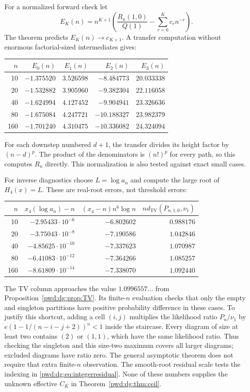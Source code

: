 \documentclass[11pt,letterpaper]{article}
\numberwithin{equation}{section}
\theoremstyle{remark}\newtheorem{remark}[theorem]{Remark}
\newcommand{\TV}{d_{\mathrm{TV}}}
\begin{document}
For a normalized forward check let
\[
 E_K(n)=n^{K+1}\left(\frac{R_n(1,0)}{Q(1)}-\sum_{r=0}^Kc_rn^{-r}\right).
\]
The theorem predicts $E_K(n)\to c_{K+1}$. A transfer computation without enormous factorial-sized intermediates gives:
\begin{center}
\begin{tabular}{@{}rrrrr@{}}\toprule
$n$ & $E_0(n)$ & $E_1(n)$ & $E_2(n)$ & $E_3(n)$\\\midrule
10 & $-1.375520$ & $3.526598$ & $-8.484773$ & $20.033338$\\
20 & $-1.532882$ & $3.905960$ & $-9.382304$ & $22.116058$\\
40 & $-1.624994$ & $4.127452$ & $-9.904941$ & $23.326636$\\
80 & $-1.675084$ & $4.247721$ & $-10.188327$ & $23.982379$\\
160 & $-1.701240$ & $4.310475$ & $-10.336082$ & $24.324094$\\\bottomrule
\end{tabular}
\end{center}
For each downstep numbered $d+1$, the transfer divides its height factor by $(n-d)^{p}$. The product of the denominators is $(n!)^p$ for every path, so this computes $R_n$ directly. This normalization is also tested against exact small cases.

For inverse diagnostics choose $L=\log a_n$ and compute the large root of $H_4(x)=L$. These are real-root errors, not threshold errors:
\begin{center}
\begin{tabular}{@{}rrrr@{}}\toprule
$n$ & $x_4(\log a_n)-n$ & $(x_4-n)n^6\log n$ & $n\TV(P_{n,1,0},\nu_1)$\\\midrule
10 & $-2.95433\cdot10^{-6}$ & $-6.802602$ & $0.988176$\\
20 & $-3.75043\cdot10^{-8}$ & $-7.190586$ & $1.042846$\\
40 & $-4.85625\cdot10^{-10}$ & $-7.337623$ & $1.070987$\\
80 & $-6.41083\cdot10^{-12}$ & $-7.364266$ & $1.085257$\\
160 & $-8.61809\cdot10^{-14}$ & $-7.338070$ & $1.092440$\\\bottomrule
\end{tabular}
\end{center}
The TV column approaches the value $1.0996557\ldots$ from Proposition~\ref{pwd:dg:prop:TV}. Its finite-$n$ evaluation checks that only the empty and singleton partitions have positive probability difference in these cases. To justify this shortcut, adding a cell $(i,j)$ multiplies the likelihood ratio $P_n/\nu_1$ by $e(1-1/(n-i-j+2))^n<1$ inside the staircase. Every diagram of size at least two contains $(2)$ or $(1,1)$, which have the same likelihood ratio. Thus checking the singleton and this size-two maximum covers all larger diagrams; excluded diagrams have ratio zero. The general asymptotic theorem does not require that extra finite-$n$ observation. The smooth-root residual scale tests the indexing in \eqref{pwd:dg:eq:integerresidual}. None of these numbers supplies the unknown effective $C_K$ in Theorem~\ref{pwd:dg:thm:ceil}.
\end{document}
